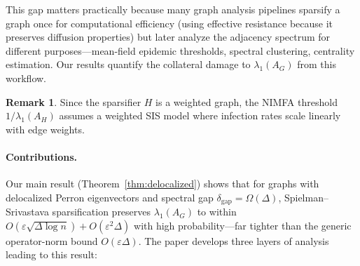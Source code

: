 \documentclass[11pt]{article}
\theoremstyle{definition}
\newtheorem{remark}[theorem]{Remark}
\newcommand{\eps}{\varepsilon}
\newcommand{\lamH}{\lambda_1(A_H)}
\newcommand{\lamG}{\lambda_1(A_G)}
\begin{document}
This gap matters practically because many graph analysis pipelines sparsify a graph once
for computational efficiency (using effective resistance because it preserves diffusion
properties) but later analyze the adjacency spectrum for different purposes---mean-field
epidemic thresholds, spectral clustering, centrality estimation. Our results quantify the
collateral damage to $\lamG$ from this workflow.

\begin{remark}
Since the sparsifier $H$ is a weighted graph, the NIMFA threshold $1/\lamH$ assumes a
weighted SIS model where infection rates scale linearly with edge weights.
\end{remark}

\paragraph{Contributions.}
Our main result (Theorem~\ref{thm:delocalized}) shows that for graphs with
delocalized Perron eigenvectors and spectral gap $\delta_{\mathrm{gap}} = \Omega(\Delta)$,
Spielman--Srivastava sparsification preserves $\lamG$ to within
$O(\eps\sqrt{\Delta\log n}) + O(\eps^2\Delta)$ with high probability---far tighter
than the generic operator-norm bound $O(\eps\Delta)$.
The paper develops three layers of analysis leading to this result:
\end{document}
